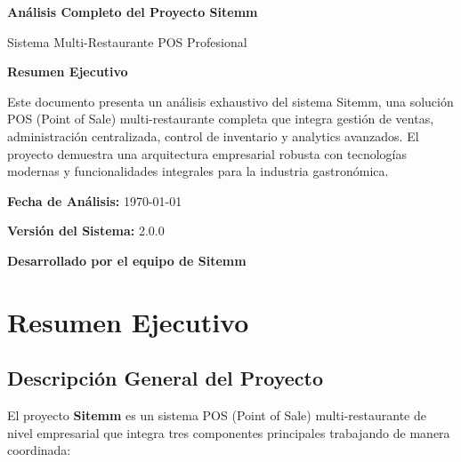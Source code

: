 \documentclass[12pt,a4paper]{article}
\begin{document}
\begin{titlepage}
\centering
\vspace*{2cm}

{\Huge\bfseries\color{blue} Análisis Completo del Proyecto Sitemm}

\vspace{1cm}

{\Large Sistema Multi-Restaurante POS Profesional}

\vspace{2cm}

\begin{minipage}{0.8\textwidth}
\centering
\textbf{Resumen Ejecutivo}\\
\vspace{0.5cm}
\parbox{0.9\textwidth}{
Este documento presenta un análisis exhaustivo del sistema Sitemm, una solución POS (Point of Sale) multi-restaurante completa que integra gestión de ventas, administración centralizada, control de inventario y analytics avanzados. El proyecto demuestra una arquitectura empresarial robusta con tecnologías modernas y funcionalidades integrales para la industria gastronómica.
}
\end{minipage}

\vspace{2cm}

{\large \textbf{Fecha de Análisis:} \today}

\vspace{1cm}

{\large \textbf{Versión del Sistema:} 2.0.0}

\vfill

{\small \textbf{Desarrollado por el equipo de Sitemm}}

\end{titlepage}

\tableofcontents
\newpage

\section{Resumen Ejecutivo}

\subsection{Descripción General del Proyecto}

El proyecto \textbf{Sitemm} es un sistema POS (Point of Sale) multi-restaurante de nivel empresarial que integra tres componentes principales trabajando de manera coordinada:
\end{document}
